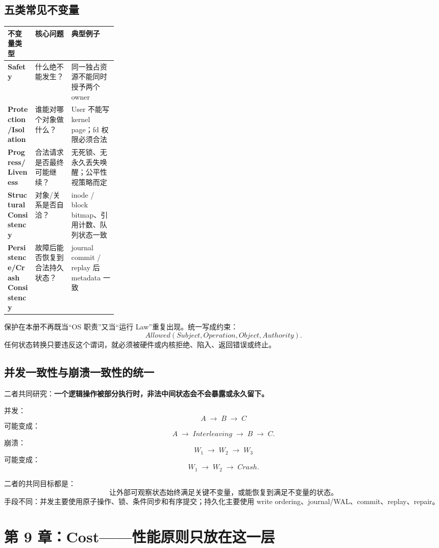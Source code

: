 \documentclass[11pt,a4paper]{ctexart}
\newcommand{\kw}[1]{\textbf{#1}}
\newcommand{\arr}{\;\longrightarrow\;}
\begin{document}
\subsection{五类常见不变量}
\begin{center}
\scriptsize
\renewcommand{\arraystretch}{1.25}
\begin{tabularx}{\linewidth}{>{\bfseries}p{0.25\linewidth} Y Y}
\toprule
不变量类型 & 核心问题 & 典型例子 \\
\midrule
Safety & 什么绝不能发生？ & 同一独占资源不能同时授予两个 owner \\
Protection/Isolation & 谁能对哪个对象做什么？ & User 不能写 kernel page；fd 权限必须合法 \\
Progress/Liveness & 合法请求是否最终可能继续？ & 无死锁、无永久丢失唤醒；公平性视策略而定 \\
Structural Consistency & 对象/关系是否自洽？ & inode / block bitmap、引用计数、队列状态一致 \\
Persistence/Crash Consistency & 故障后能否恢复到合法持久状态？ & journal commit / replay 后 metadata 一致 \\
\bottomrule
\end{tabularx}
\end{center}

\begin{corebox}
保护在本册不再既当“OS 职责”又当“运行 Law”重复出现。统一写成约束：
\[
\boxed{Allowed(Subject,Operation,Object,Authority)}.
\]
任何状态转换只要违反这个谓词，就必须被硬件或内核拒绝、陷入、返回错误或终止。
\end{corebox}

\subsection{并发一致性与崩溃一致性的统一}
二者共同研究：\kw{一个逻辑操作被部分执行时，非法中间状态会不会暴露或永久留下。}

并发：
\[
A\arr B\arr C
\]
可能变成：
\[
A\arr\boxed{Interleaving}\arr B\arr C.
\]
崩溃：
\[
W_1\arr W_2\arr W_3
\]
可能变成：
\[
W_1\arr W_2\arr\boxed{Crash}.
\]

二者的共同目标都是：
\[
\boxed{\text{让外部可观察状态始终满足关键不变量，或能恢复到满足不变量的状态。}}
\]
手段不同：并发主要使用原子操作、锁、条件同步和有序提交；持久化主要使用 write ordering、journal/WAL、commit、replay、repair。

\section{第 9 章：Cost——性能原则只放在这一层}
\end{document}
